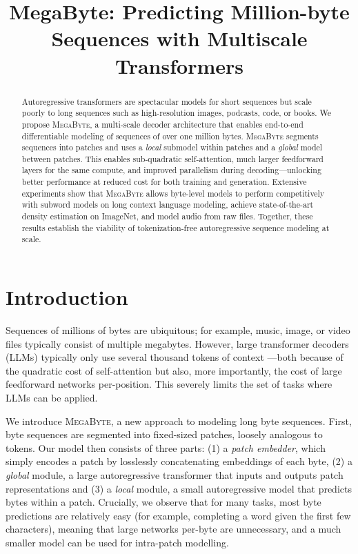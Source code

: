 \title{MegaByte: Predicting Million-byte Sequences with Multiscale Transformers}

\begin{abstract}
Autoregressive transformers are spectacular models for short sequences but scale poorly to long sequences such as high-resolution images, podcasts, code, or books. We propose \textsc{MegaByte}, a multi-scale decoder architecture that enables end-to-end differentiable modeling of sequences of over one million bytes.
\textsc{MegaByte} segments sequences into patches and uses a \emph{local} submodel within patches and a \emph{global} model between patches. This enables sub-quadratic self-attention, much larger feedforward layers for the same compute, and improved parallelism during decoding---unlocking  better performance at reduced cost for both training and generation. Extensive experiments show that \textsc{MegaByte} allows byte-level models to perform competitively with subword models on long context language modeling, achieve state-of-the-art density estimation on ImageNet, and model audio from raw files. Together, these results establish the  viability of tokenization-free autoregressive sequence modeling at scale.
\end{abstract}

\section{Introduction}
\label{sec:intro}
Sequences of millions of bytes are ubiquitous; for example, music, image, or video files typically consist of multiple megabytes. However, large transformer decoders (LLMs) typically only use several thousand tokens of context \citep{gpt3,Zhang2022OPT:Models}---both because of the quadratic cost of self-attention but also, more importantly, the cost of large feedforward networks per-position. This severely limits the set of tasks where LLMs can be applied.

We introduce \textsc{MegaByte}, a new approach to modeling long byte sequences. First, byte sequences are segmented into fixed-sized patches, loosely analogous to tokens. Our model then consists of three parts: (1) a \emph{patch embedder}, which simply encodes a patch by losslessly concatenating embeddings of each byte, (2) a \emph{global} module, a large autoregressive transformer that inputs and outputs patch representations and (3) a \emph{local} module, a small autoregressive model that predicts bytes within a patch. Crucially, we observe that for many tasks, most byte predictions are relatively easy (for example, completing a word given the first few characters), meaning that large networks per-byte are unnecessary, and a much smaller model can be used for intra-patch modelling.

